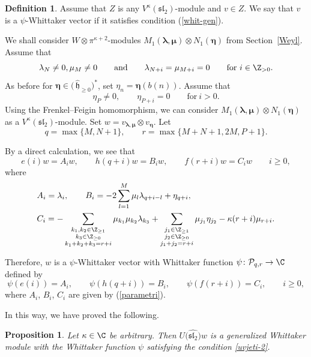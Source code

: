 \documentclass[10pt,a4paper]{amsart}
\numberwithin{equation}{section}
\newtheorem{Proposition}[Theorem]{Proposition}
\theoremstyle{definition}
\newtheorem{Definition}[Theorem]{Definition}
\let\frak\mathfrak
\newcommand{\1}{\textbf{1}}
\begin{document}
\begin{Definition}Assume that $Z$ is any $V^{\kappa}(\mathfrak{sl}_2)$-module and $v \in Z$. We say that $v$ is a $\psi$\nobreakdash-Whit\-tak\-er vector if it satisfies condition (\ref{whit-gen}).
 \end{Definition}

We shall consider $W \otimes \pi^{\kappa +2}$-modules $M_{1} (\bm{\lambda}, \bm{\mu}) \otimes N_1(\bm{\eta})$ from Section~\ref{Weyl}. Assume that
 \[ \lambda_N \ne 0, \mu_M \ne 0 \qquad \mbox{and} \qquad \lambda_{N+ i} = \mu_{M+i} = 0 \qquad \mbox{for} \ i \in {\Z}_{>0}. \]
As before for $\bm{\eta} \in \bigl(\, \widehat{\mathfrak h}_{\ge 0}\bigr) ^*$, set $\eta_n = \bm{\eta} (b(n))$. Assume that
 \[ \eta_P \ne 0, \qquad \eta_{P+i } =0 \qquad \mbox{for} \ i >0. \]
Using the Frenkel--Feigin homomorphism, we can consider $M_{1} (\bm{\lambda}, \bm{\mu}) \otimes N_1(\bm{\eta})$ as a $V^{\kappa} (\mathfrak{sl}_2)$-module.
Set $w = v_{\bm{\lambda}, \bm{\mu}} \otimes v_{\bm{\eta}}$.
Let
 \[ q = \max \{ M, N+ 1\}, \qquad r = \max \{M+N+1, 2M, P+1\}. \]

By a direct calculation, we see that
\begin{equation*}%
e(i)w=A_iw, \qquad h(q+i)w=B_iw, \qquad f(r+i)w=C_iw \qquad i\ge0,
\end{equation*}
where
\begin{align}
&A_i= \lambda_i,\qquad
B_i = -2\sum_{l=1}^M\mu_l\lambda_{q+i-l}+\eta_{q+i},\nonumber\\
&C_i= -\sum_{\substack{k_1,k_2\in {\Z}_{\ge1}\\ k_3\in {\Z}_{\ge0}\\ k_1+k_2+k_3=r+i}}
\mu_{k_1}\mu_{k_2}\lambda_{k_3}
+\sum_{\substack{j_1\in {\Z}_{\ge1}\\ j_2\in {\Z}_{\ge0}\\ j_1+j_2=r+i}}
\mu_{j_1}\eta_{j_2}-\kappa(r+i)\mu_{r+i}.\label{parametri}
\end{align}


 Therefore, $w$ is a $\psi$-Whittaker vector with Whittaker function $\psi \colon \mathcal P_{q,r} \rightarrow \C$ defined by
\begin{equation}\label{uvjeti-2}
\psi(e(i))=A_i, \qquad \psi(h(q+i))=B_i, \qquad \psi(f(r+i))=C_i, \qquad i\ge0,
\end{equation}
 where $A_i$, $B_i$, $C_i$ are given by (\ref{parametri}).

 In this way, we have proved the following.

 \begin{Proposition}
 Let $
\kappa \in {\C}$ be arbitrary. Then $U\bigl(\widehat{\frak{sl}_2}\bigr)w$ is a generalized Whittaker module with the Whittaker function $\psi$ satisfying the condition \eqref{uvjeti-2}.
 \end{Proposition}
\end{document}
